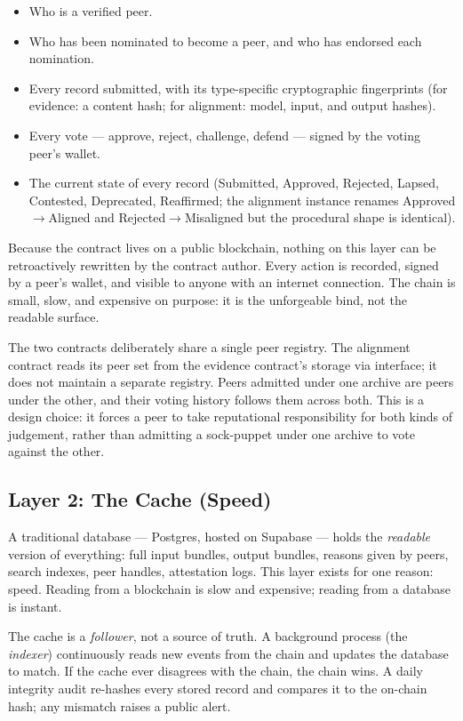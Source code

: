\documentclass[11pt,a4paper]{article}
\begin{document}
\begin{itemize}[leftmargin=1.5em]
  \item Who is a verified peer.
  \item Who has been nominated to become a peer, and who has
        endorsed each nomination.
  \item Every record submitted, with its type-specific
        cryptographic fingerprints (for evidence: a content
        hash; for alignment: model, input, and output hashes).
  \item Every vote --- approve, reject, challenge, defend ---
        signed by the voting peer's wallet.
  \item The current state of every record (Submitted, Approved,
        Rejected, Lapsed, Contested, Deprecated, Reaffirmed; the
        alignment instance renames Approved$\to$Aligned and
        Rejected$\to$Misaligned but the procedural shape is
        identical).
\end{itemize}

Because the contract lives on a public blockchain, nothing on
this layer can be retroactively rewritten by the contract
author. Every action is recorded, signed by a peer's wallet, and
visible to anyone with an internet connection. The chain is
small, slow, and expensive on purpose: it is the unforgeable
bind, not the readable surface.

The two contracts deliberately share a single peer registry. The
alignment contract reads its peer set from the evidence
contract's storage via interface; it does not maintain a
separate registry. Peers admitted under one archive are peers
under the other, and their voting history follows them across
both. This is a design choice: it forces a peer to take
reputational responsibility for both kinds of judgement, rather
than admitting a sock-puppet under one archive to vote against
the other.

\subsection{Layer 2: The Cache (Speed)}

A traditional database --- Postgres, hosted on Supabase --- holds
the \emph{readable} version of everything: full input bundles,
output bundles, reasons given by peers, search indexes, peer
handles, attestation logs. This layer exists for one reason:
speed. Reading from a blockchain is slow and expensive; reading
from a database is instant.

The cache is a \emph{follower}, not a source of truth. A
background process (the \emph{indexer}) continuously reads new
events from the chain and updates the database to match. If the
cache ever disagrees with the chain, the chain wins. A daily
integrity audit re-hashes every stored record and compares it to
the on-chain hash; any mismatch raises a public alert.
\end{document}

